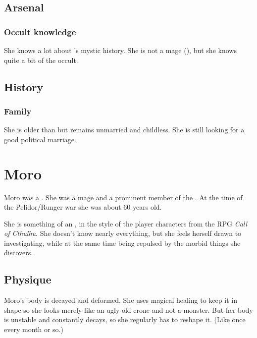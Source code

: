\subsection{Arsenal}
\subsubsection{Occult knowledge}
She knows a lot about \Malcur's mystic history. 
She is not a mage (), but she knows quite a bit of the occult. 









\subsection{History}
\subsubsection{Family}
She is older than \Tiroco{} but remains unmarried and childless. 
She is still looking for a good political marriage. 















\section{Moro \Cornel}
Moro \Cornel{} was a \sphyle{}. 
She was a \rethyactic mage and a prominent member of the \Malcuric{} \ishrah. 
At the time of the Pelidor/Runger war she was about 60 years old. 

She is something of an , in the style of the player characters from the RPG \emph{Call of Cthulhu}. She doesn't know nearly everything, but she feels herself drawn to investigating, while at the same time being repulsed by the morbid things she discovers. 









\subsection{Physique}
Moro's body is decayed and deformed. 
She uses magical healing to keep it in shape so she looks merely like an ugly old crone and not a monster. 
But her body is unstable and constantly decays, so she regularly has to reshape it. 
(Like once every month or so.)

